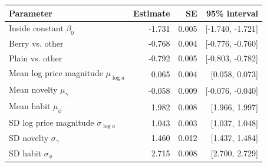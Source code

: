 \begin{tabular}{lrrr}\toprule
Parameter & Estimate & SE & 95\% interval\\\midrule
Inside constant $\beta_0$ & -1.731 & 0.005 & [-1.740, -1.721] \\
Berry vs. other & -0.768 & 0.004 & [-0.776, -0.760] \\
Plain vs. other & -0.792 & 0.005 & [-0.803, -0.782] \\
Mean log price magnitude $\mu_{\log a}$ & 0.065 & 0.004 & [0.058, 0.073] \\
Mean novelty $\mu_\gamma$ & -0.058 & 0.009 & [-0.076, -0.040] \\
Mean habit $\mu_\phi$ & 1.982 & 0.008 & [1.966, 1.997] \\
SD log price magnitude $\sigma_{\log a}$ & 1.043 & 0.003 & [1.037, 1.048] \\
SD novelty $\sigma_\gamma$ & 1.460 & 0.012 & [1.437, 1.484] \\
SD habit $\sigma_\phi$ & 2.715 & 0.008 & [2.700, 2.729] \\
\bottomrule\end{tabular}
